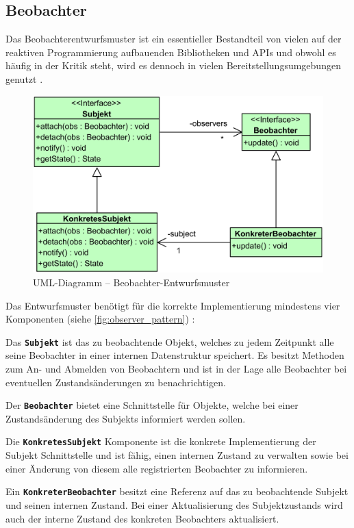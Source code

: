 \subsection{Beobachter}
Das Beobachterentwurfsmuster ist ein essentieller Bestandteil von vielen auf der reaktiven Programmierung aufbauenden Bibliotheken und APIs \cite{Salvaneschi2015} und obwohl es häufig in der Kritik steht, wird es dennoch in vielen Bereitstellungsumgebungen genutzt \cite{Maier2010}.
\begin{figure}[H]
	\includegraphics[width=\textwidth]{Abbildungen/Observer Pattern.png}
	\caption{UML-Diagramm -- Beobachter-Entwurfsmuster}
	\label{fig:observer_pattern}
\end{figure}
\noindent Das Entwurfsmuster benötigt für die korrekte Implementierung mindestens vier Komponenten (siehe \autoref{fig:observer_pattern}) \cite{Gamma1993}:
\begin{description}
	\item Das \texttt{\textbf{Subjekt}} ist das zu beobachtende Objekt, welches zu jedem Zeitpunkt alle seine Beobachter in einer internen Datenstruktur speichert. Es besitzt Methoden zum An- und Abmelden von Beobachtern und ist in der Lage alle Beobachter bei eventuellen Zustandsänderungen zu benachrichtigen.
	\item Der \texttt{\textbf{Beobachter}} bietet eine Schnittstelle für Objekte, welche bei einer Zustandsänderung des Subjekts informiert werden sollen.
	\item Die \texttt{\textbf{KonkretesSubjekt}} Komponente ist die konkrete Implementierung der Subjekt Schnittstelle und ist fähig, einen internen Zustand zu verwalten sowie bei einer Änderung von diesem alle registrierten Beobachter zu informieren.
	\item Ein \texttt{\textbf{KonkreterBeobachter}} besitzt eine Referenz auf das zu beobachtende Subjekt und seinen internen Zustand. Bei einer Aktualisierung des Subjektzustands wird auch der interne Zustand des konkreten Beobachters aktualisiert.
\end{description}
\newpage
